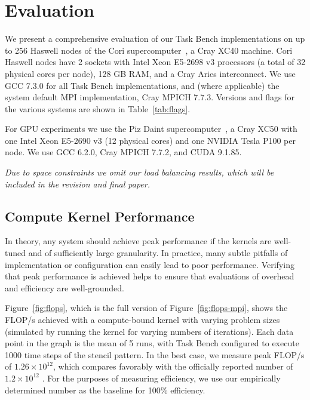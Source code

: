 \section{Evaluation}
\label{sec:evaluation}







We present a comprehensive evaluation of our Task Bench implementations on up to 256
Haswell nodes of the Cori supercomputer~\cite{Cori}, a Cray XC40
machine. Cori Haswell nodes have 2 sockets with Intel Xeon E5-2698 v3
processors (a total of 32 physical cores per node), 128 GB RAM, and a
Cray Aries interconnect. We use GCC 7.3.0 for all Task Bench
implementations, and (where applicable) the system default MPI
implementation, Cray MPICH 7.7.3. Versions and flags for the
various systems are shown in Table~\ref{tab:flags}.

For GPU experiments we use the Piz Daint supercomputer~\cite{PizDaint}, a Cray XC50 with
one Intel Xeon E5-2690 v3 (12 physical cores) and one NVIDIA Tesla
P100 per node. We use GCC 6.2.0, Cray MPICH 7.7.2, and
CUDA 9.1.85.

\emph{Due to space constraints we omit our load balancing results, which will be included in the revision and final paper.}

\subsection{Compute Kernel Performance}
\label{subsec:peak-performance-and-efficiency}

In theory, any system should achieve peak performance if
the kernels are well-tuned and of sufficiently large granularity. In
practice, many subtle pitfalls of implementation or configuration can easily lead to poor performance. Verifying that peak performance is
achieved helps to ensure that evaluations of overhead and
efficiency are well-grounded.

Figure~\ref{fig:flops}, which is the full version of
Figure~\ref{fig:flops-mpi}, shows the FLOP/s achieved with a compute-bound
kernel with varying problem sizes (simulated by running the kernel for varying numbers of iterations). Each data point in the graph is the mean of 5 runs, with Task Bench configured to execute 1000 time steps of the stencil pattern. In the best case, we measure peak FLOP/s of
$1.26 \times 10^{12}$, which compares favorably with the officially
reported number of $1.2 \times 10^{12}$ \cite{Cori}. For the purposes
of measuring efficiency, we use our empirically determined number as
the baseline for 100\% efficiency.

